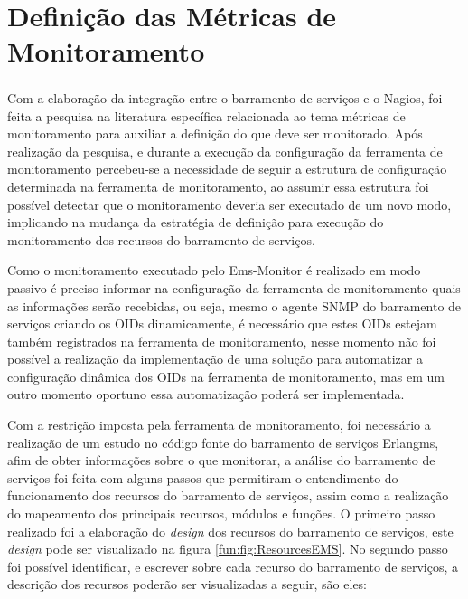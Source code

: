 
\section{Definição das Métricas de Monitoramento}
\label{metricas_monitoramento}

Com a elaboração da integração entre o barramento de serviços e o Nagios\textsuperscript{\textregistered}, foi feita a pesquisa na literatura específica relacionada ao tema métricas de monitoramento para auxiliar a definição do que deve ser monitorado. Após realização da pesquisa, e durante a execução da configuração da ferramenta de monitoramento percebeu-se a necessidade de seguir a estrutura de configuração determinada na ferramenta de monitoramento, ao assumir essa estrutura foi possível detectar que o monitoramento deveria ser executado de um novo modo, implicando na mudança da estratégia de definição para execução do monitoramento dos recursos do barramento de serviços. 

Como o monitoramento executado pelo Ems-Monitor é realizado em modo passivo é preciso informar na configuração da ferramenta de monitoramento quais as informações serão recebidas, ou seja, mesmo o agente \acrshort{SNMP} do barramento de serviços criando os \acrshort{OID}s dinamicamente, é necessário que estes \acrshort{OID}s estejam também registrados na ferramenta de monitoramento, nesse momento  não foi possível a realização da implementação de uma solução para automatizar a configuração dinâmica dos \acrshort{OID}s na ferramenta de monitoramento, mas em um outro momento oportuno essa automatização poderá ser implementada.

Com a restrição imposta pela ferramenta de monitoramento, foi necessário a realização de um estudo no código fonte do barramento de serviços Erlangms, afim de obter informações sobre o que monitorar, a análise do barramento de serviços foi feita com alguns passos que permitiram o entendimento do funcionamento dos recursos do barramento de serviços, assim como a realização do mapeamento dos principais recursos, módulos e funções. O primeiro passo realizado foi a elaboração do \textit{design} dos recursos do barramento de serviços, este \textit{design} pode ser visualizado na figura \ref{fun:fig:ResourcesEMS}. No segundo passo foi possível identificar, e escrever sobre cada recurso do barramento de serviços, a descrição dos recursos poderão ser visualizadas a seguir, são eles:


